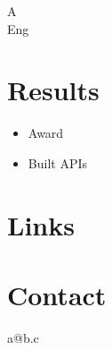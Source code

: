\documentclass[11pt]{article}
\begin{document}
{\LARGE A}\\
{\large Eng}\\

\section*{Results}
\begin{itemize}
\item Award
\item Built APIs
\end{itemize}

\section*{Links}

\section*{Contact}
a@b.c\\
\end{document}
